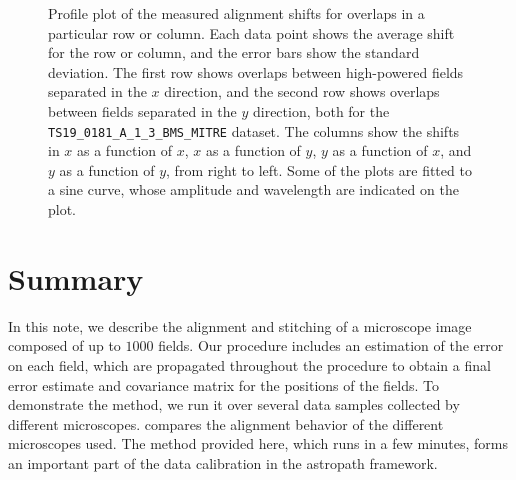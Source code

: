 \documentclass{article}
\begin{document}
\begin{figure}[ht]
\begin{subfigure}{0.24\linewidth}
		\caption{}
		\label{fig:sinewave4yyAKY}
	\end{subfigure}
	\caption{Profile plot of the measured alignment shifts for overlaps in a particular row or column.  Each data point shows the average shift for the row or column, and the error bars show the standard deviation.  The first row shows overlaps between high-powered fields separated in the $x$ direction, and the second row shows overlaps between fields separated in the $y$ direction, both for the \texttt{TS19\_0181\_A\_1\_3\_BMS\_MITRE} dataset.  The columns show the shifts in $x$ as a function of $x$, $x$ as a function of $y$, $y$ as a function of $x$, and $y$ as a function of $y$, from right to left.  Some of the plots are fitted to a sine curve, whose amplitude and wavelength are indicated on the plot.}
	\label{fig:sinewavesAKY}
\end{figure}

\clearpage

\section{Summary}

In this note, we describe the alignment and stitching of a microscope image composed of up to $1000$ fields.  Our procedure includes an estimation of the error on each field, which are propagated throughout the procedure to obtain a final error estimate and covariance matrix for the positions of the fields.  To demonstrate the method, we run it over several data samples collected by different microscopes.   compares the alignment behavior of the different microscopes used.  The method provided here, which runs in a few minutes, forms an important part of the data calibration in the astropath framework.
\end{document}
